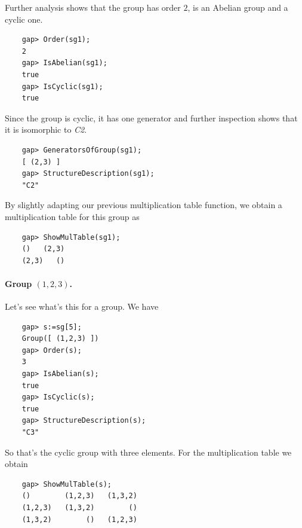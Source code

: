 Further analysis shows that the group has order $2$, is an Abelian group and a cyclic one.

\begin{verbatim}
    gap> Order(sg1);
    2
    gap> IsAbelian(sg1);
    true
    gap> IsCyclic(sg1);
    true
\end{verbatim}

Since the group is cyclic, it has one generator and further inspection shows that it is isomorphic to \emph{C2}.

\begin{verbatim}
    gap> GeneratorsOfGroup(sg1);
    [ (2,3) ]
    gap> StructureDescription(sg1);
    "C2"
\end{verbatim}

By slightly adapting our previous multiplication table function, we obtain a multiplication table for this group as

\begin{verbatim}
    gap> ShowMulTable(sg1);
    ()   (2,3)   
    (2,3)   ()   
\end{verbatim}

\paragraph{Group $(1,2,3)$.} Let's see what's this for a group. We have

\begin{verbatim}
    gap> s:=sg[5];
    Group([ (1,2,3) ])
    gap> Order(s);
    3
    gap> IsAbelian(s);
    true
    gap> IsCyclic(s);
    true
    gap> StructureDescription(s);
    "C3"
\end{verbatim}

So that's the cyclic group with three elements. For the multiplication table we obtain

\begin{verbatim}
    gap> ShowMulTable(s);
    ()        (1,2,3)   (1,3,2)   
    (1,2,3)   (1,3,2)        ()   
    (1,3,2)        ()   (1,2,3)   
\end{verbatim}


